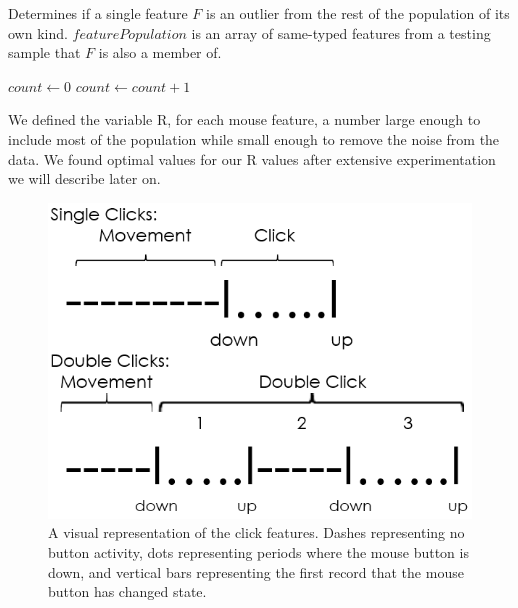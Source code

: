 \documentclass[conference]{IEEEtran}
\begin{document}
\begin{algorithm}
\caption{Determines if a single feature $F$ is an outlier from the rest of the population of its own kind. $featurePopulation$ is an array of same-typed features from a testing sample that $F$ is also a member of.}\label{euclid}
\begin{algorithmic}[1]
\State $\textit{count} \gets 0$
				\State $count \gets count + 1$
			\EndIf
	\EndFor

		\State {}
	\Else
		\State {} 

	\EndIf
\EndProcedure
\end{algorithmic}
\end{algorithm}

We defined the variable R, for each mouse feature, a number large enough to include most of the population while small enough to remove the noise from the data. We found optimal values for our R values after extensive experimentation we will describe later on.


\begin{figure}[t]
  \includegraphics[width=1\linewidth]{clickDiag}
  \caption{A visual representation of the click features. Dashes representing no button activity, dots representing periods where the mouse button is down, and vertical bars representing the first record that the mouse button has changed state.}
\end{figure}
\end{document}
